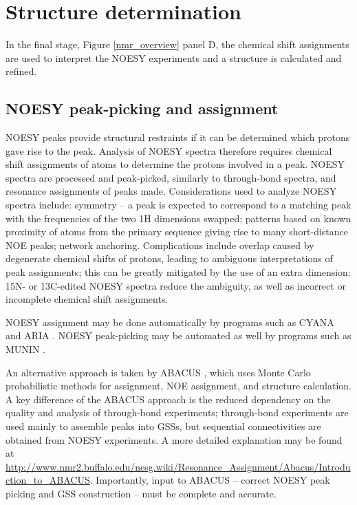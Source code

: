 \section{Structure determination}

In the final stage, Figure \ref{nmr_overview} panel D, the chemical shift 
assignments are used to interpret the NOESY experiments and a structure
is calculated and refined.

\subsection*{NOESY peak-picking and assignment}
NOESY peaks provide structural restraints if it can be 
determined which protons gave rise to the peak.  Analysis of NOESY spectra 
therefore requires chemical shift assignments of atoms to 
determine the protons involved in a peak.  
NOESY spectra are  processed and peak-picked, similarly to through-bond 
spectra, and resonance assignments of peaks made.  
Considerations used to analyze 
NOESY spectra include: symmetry -- a peak is expected to correspond to a 
matching peak with the frequencies of the two 1H dimensions swapped; patterns 
based on known proximity of atoms from the primary sequence giving rise to 
many short-distance NOE peaks; network anchoring.  Complications include 
overlap caused by degenerate chemical shifts of protons, leading to 
ambiguous interpretations of peak assignments; this can be greatly mitigated 
by the use of an extra dimension:  15N- or 13C-edited NOESY spectra reduce 
the ambiguity, as well as incorrect or incomplete chemical shift assignments.

NOESY assignment may be done automatically by programs such as CYANA and 
ARIA \cite{cyana2004, aria2003}.  
NOESY peak-picking may be automated as well by programs such as
MUNIN \cite{munin, korzhnev2001munin}.

An alternative approach is taken by ABACUS \cite{abacus_assignment}, which uses
Monte Carlo probabilistic methods for assignment, NOE assignment, and structure
calculation.  A key difference of the ABACUS approach is the reduced dependency
on the quality and analysis of through-bond experiments; through-bond experiments
are used mainly to assemble peaks into GSSs, but sequential connectivities are
obtained from NOESY experiments.  A more detailed explanation may be found at 
\url{http://www.nmr2.buffalo.edu/nesg.wiki/Resonance_Assignment/Abacus/Introduction_to_ABACUS}.
Importantly, input to ABACUS -- correct NOESY peak picking and GSS construction
-- must be complete and accurate.

